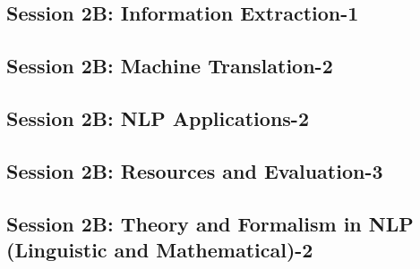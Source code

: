 \subsection{\large Session 2B: Information Extraction-1}
\label{parallel-session-2B-trackE}
\TrackELoc\hfill\sessionchair{}{}
\clearpage
\subsection{\large Session 2B: Machine Translation-2}
\label{parallel-session-2B-trackF}
\TrackFLoc\hfill\sessionchair{}{}
\clearpage
\subsection{\large Session 2B: NLP Applications-2}
\label{parallel-session-2B-trackG}
\TrackGLoc\hfill\sessionchair{}{}
\clearpage
\subsection{\large Session 2B: Resources and Evaluation-3}
\label{parallel-session-2B-trackH}
\TrackHLoc\hfill\sessionchair{}{}
\clearpage
\subsection{\large Session 2B: Theory and Formalism in NLP (Linguistic and Mathematical)-2}
\label{parallel-session-2B-trackI}
\TrackILoc\hfill\sessionchair{}{}
\clearpage


